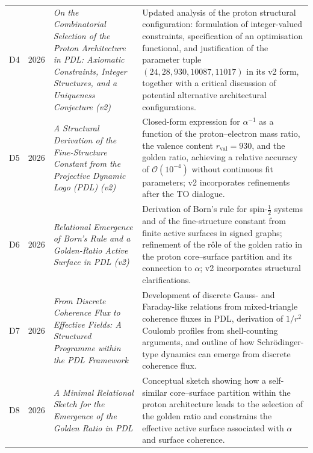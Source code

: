 \documentclass{article}
\begin{document}
\begin{longtable}{@{}llL{4cm}p{9.5cm}@{}}
D4 & 2026 & \textit{On the Combinatorial Selection of the Proton Architecture in PDL: Axiomatic Constraints, Integer Structures, and a Uniqueness Conjecture (v2)} &
Updated analysis of the proton structural configuration: formulation of integer-valued constraints, specification of an optimisation functional, and justification of the parameter tuple $(24,28,930,10087,11017)$ in its v2 form, together with a critical discussion of potential alternative architectural configurations. \cite{Combinatorial_Proton_v2_2026} \\[0.5em]

D5 & 2026 & \textit{A Structural Derivation of the Fine-Structure Constant from the Projective Dynamic Logo (PDL) (v2)} &
Closed-form expression for $\alpha^{-1}$ as a function of the proton–electron mass ratio, the valence content $r_{\mathrm{val}}=930$, and the golden ratio, achieving a relative accuracy of $\mathcal{O}(10^{-4})$ without continuous fit parameters; v2 incorporates refinements after the TO dialogue. \cite{Alpha_PDL_v2_2026} \\[0.5em]

D6 & 2026 & \textit{Relational Emergence of Born's Rule and a Golden-Ratio Active Surface in PDL (v2)} &
Derivation of Born's rule for spin-$\tfrac{1}{2}$ systems and of the fine-structure constant from finite active surfaces in signed graphs; refinement of the rôle of the golden ratio in the proton core–surface partition and its connection to $\alpha$; v2 incorporates structural clarifications. \cite{Born_Golden_v2_2026,Golden_Ratio_Sketch_2026} \\[0.5em]

D7 & 2026 & \textit{From Discrete Coherence Flux to Effective Fields: A Structured Programme within the PDL Framework} &
Development of discrete Gauss- and Faraday-like relations from mixed-triangle coherence fluxes in PDL, derivation of $1/r^2$ Coulomb profiles from shell-counting arguments, and outline of how Schr\"odinger-type dynamics can emerge from discrete coherence flux. \cite{Effective_Fields_PDL_2026} \\[0.5em]

D8 & 2026 & \textit{A Minimal Relational Sketch for the Emergence of the Golden Ratio in PDL} &
Conceptual sketch showing how a self-similar core–surface partition within the proton architecture leads to the selection of the golden ratio and constrains the effective active surface associated with $\alpha$ and surface coherence. \cite{Golden_Ratio_Sketch_2026} \\[0.5em]


\end{longtable}
\end{document}
